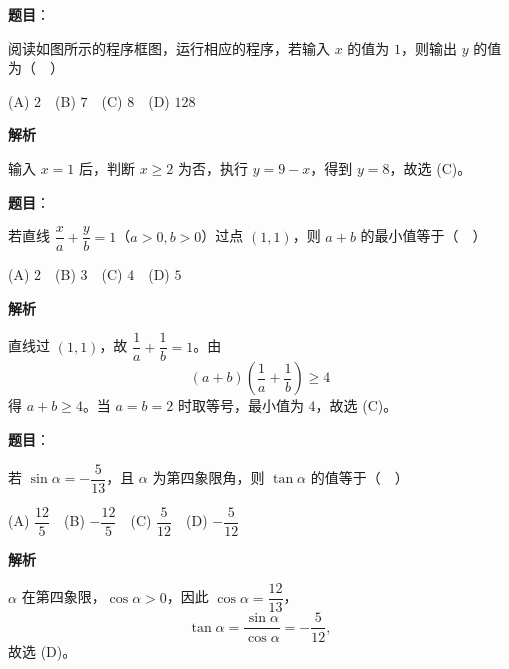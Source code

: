 \begin{answer}

\textbf{题目}：

阅读如图所示的程序框图，运行相应的程序，若输入 \(x\) 的值为 \(1\)，则输出 \(y\) 的值为（　）

(A) \(2\)　(B) \(7\)　(C) \(8\)　(D) \(128\)
\nopagebreak[4]
\begin{center}\end{center}
\nopagebreak[4]
\textbf{解析}

输入 \(x=1\) 后，判断 \(x\geqslant2\) 为否，执行 \(y=9-x\)，得到 \(y=8\)，故选 (C)。


\end{answer}
\begin{answer}

\textbf{题目}：

若直线 \(\dfrac{x}{a}+\dfrac{y}{b}=1\)（\(a>0,b>0\)）过点 \((1,1)\)，则 \(a+b\) 的最小值等于（　）

(A) \(2\)　(B) \(3\)　(C) \(4\)　(D) \(5\)

\textbf{解析}

直线过 \((1,1)\)，故 \(\dfrac1a+\dfrac1b=1\)。由
\nopagebreak[4]
\[
(a+b)\left(\frac1a+\frac1b\right)\geqslant4
\]
得 \(a+b\geqslant4\)。当 \(a=b=2\) 时取等号，最小值为 \(4\)，故选 (C)。


\end{answer}
\begin{answer}

\textbf{题目}：

若 \(\sin\alpha=-\dfrac{5}{13}\)，且 \(\alpha\) 为第四象限角，则 \(\tan\alpha\) 的值等于（　）

(A) \(\dfrac{12}{5}\)　(B) \(-\dfrac{12}{5}\)　(C) \(\dfrac{5}{12}\)　(D) \(-\dfrac{5}{12}\)

\textbf{解析}

\(\alpha\) 在第四象限，\(\cos\alpha>0\)，因此 \(\cos\alpha=\dfrac{12}{13}\)，
\nopagebreak[4]
\[
\tan\alpha=\frac{\sin\alpha}{\cos\alpha}=-\frac5{12},
\]
故选 (D)。


\end{answer}
